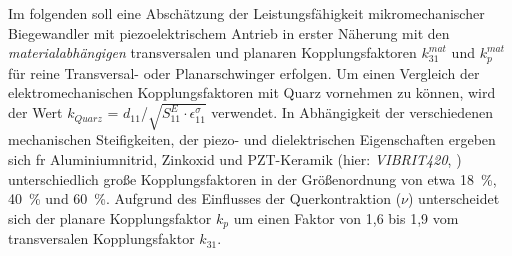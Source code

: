 %
Im folgenden soll eine Abschätzung der Leistungsfähigkeit mikromechanischer
Biegewandler mit piezoelektrischem Antrieb in erster Näherung
mit den {\em materialabhängigen} transversalen und planaren Kopplungsfaktoren
$k_{31}^{mat}$ und $k_{p}^{mat}$ für reine Transversal- oder Planarschwinger
erfolgen. Um einen Vergleich der elektromechanischen Kopplungsfaktoren mit
Quarz vornehmen zu können, wird der Wert
$k_{Quarz}$ = $d_{11}$/$\sqrt{S^{E}_{11} \cdot \epsilon^{\sigma}_{11}}$
verwendet. In Abhängigkeit der
verschiedenen mechanischen Steifigkeiten, der piezo- und dielektrischen
Eigenschaften ergeben sich fr Aluminiumnitrid, Zinkoxid und PZT-Keramik
(hier: {\sl VIBRIT420}, \cite{Sie81}) unterschiedlich große
Kopplungsfaktoren in der Größenordnung von etwa 18~\%, 40~\% und 60~\%.
Aufgrund des Einflusses
der Querkontraktion ($\nu$) unterscheidet sich der planare Kopplungsfaktor
$k_{p}$ um einen Faktor von 1,6 bis 1,9 vom transversalen Kopplungsfaktor
$k_{31}$.
